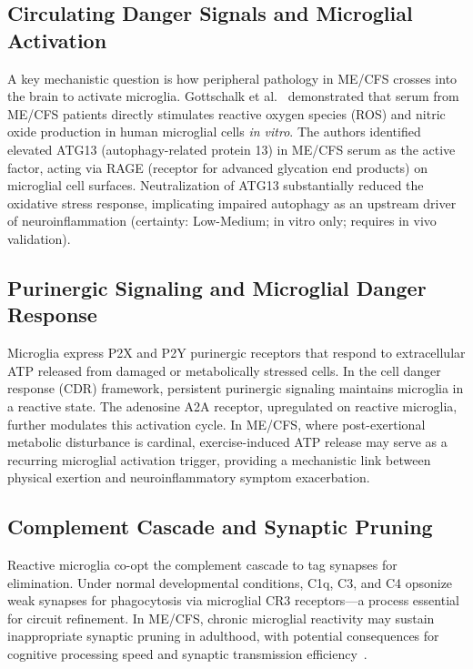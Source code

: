 \subsection{Circulating Danger Signals and Microglial Activation}

A key mechanistic question is how peripheral pathology in ME/CFS crosses into the brain to activate microglia. Gottschalk et al.~\cite{Gottschalk2022ATG13} demonstrated that serum from ME/CFS patients directly stimulates reactive oxygen species (ROS) and nitric oxide production in human microglial cells \textit{in vitro}. The authors identified elevated ATG13 (autophagy-related protein 13) in ME/CFS serum as the active factor, acting via RAGE (receptor for advanced glycation end products) on microglial cell surfaces. Neutralization of ATG13 substantially reduced the oxidative stress response, implicating impaired autophagy as an upstream driver of neuroinflammation (certainty: Low-Medium; in vitro only; requires in vivo validation).

\subsection{Purinergic Signaling and Microglial Danger Response}

Microglia express P2X and P2Y purinergic receptors that respond to extracellular ATP released from damaged or metabolically stressed cells. In the cell danger response (CDR) framework, persistent purinergic signaling maintains microglia in a reactive state. The adenosine A2A receptor, upregulated on reactive microglia, further modulates this activation cycle. In ME/CFS, where post-exertional metabolic disturbance is cardinal, exercise-induced ATP release may serve as a recurring microglial activation trigger, providing a mechanistic link between physical exertion and neuroinflammatory symptom exacerbation.

\subsection{Complement Cascade and Synaptic Pruning}

Reactive microglia co-opt the complement cascade to tag synapses for elimination. Under normal developmental conditions, C1q, C3, and C4 opsonize weak synapses for phagocytosis via microglial CR3 receptors---a process essential for circuit refinement. In ME/CFS, chronic microglial reactivity may sustain inappropriate synaptic pruning in adulthood, with potential consequences for cognitive processing speed and synaptic transmission efficiency~\cite{RenzPolster2022}.

